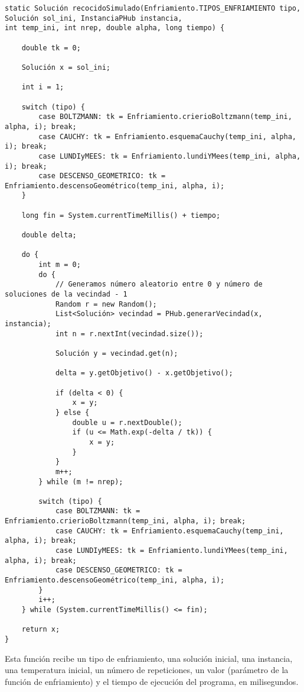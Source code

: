 \documentclass[12pt,a4paper,twoside,openright,titlepage,final]{article}
\begin{document}
\begin{verbatim}
static Solución recocidoSimulado(Enfriamiento.TIPOS_ENFRIAMIENTO tipo, Solución sol_ini, InstanciaPHub instancia,
int temp_ini, int nrep, double alpha, long tiempo) {

    double tk = 0;

    Solución x = sol_ini;

    int i = 1;

    switch (tipo) {
    	case BOLTZMANN: tk = Enfriamiento.crierioBoltzmann(temp_ini, alpha, i); break;
    	case CAUCHY: tk = Enfriamiento.esquemaCauchy(temp_ini, alpha, i); break;
    	case LUNDIyMEES: tk = Enfriamiento.lundiYMees(temp_ini, alpha, i); break;
    	case DESCENSO_GEOMETRICO: tk = Enfriamiento.descensoGeométrico(temp_ini, alpha, i);
    }

    long fin = System.currentTimeMillis() + tiempo;

    double delta;

    do {
        int m = 0;
        do {
            // Generamos número aleatorio entre 0 y número de soluciones de la vecindad - 1
            Random r = new Random();
            List<Solución> vecindad = PHub.generarVecindad(x, instancia);
            int n = r.nextInt(vecindad.size());

            Solución y = vecindad.get(n);

            delta = y.getObjetivo() - x.getObjetivo();

            if (delta < 0) {
                x = y;
            } else {
                double u = r.nextDouble();
                if (u <= Math.exp(-delta / tk)) {
                    x = y;
                }
            }
            m++;
        } while (m != nrep);
        
        switch (tipo) {
            case BOLTZMANN: tk = Enfriamiento.crierioBoltzmann(temp_ini, alpha, i); break;
         	case CAUCHY: tk = Enfriamiento.esquemaCauchy(temp_ini, alpha, i); break;
    	    case LUNDIyMEES: tk = Enfriamiento.lundiYMees(temp_ini, alpha, i); break;
    	    case DESCENSO_GEOMETRICO: tk = Enfriamiento.descensoGeométrico(temp_ini, alpha, i);
        }
        i++;
    } while (System.currentTimeMillis() <= fin);

    return x;
}
\end{verbatim}

Esta función recibe un tipo de enfriamiento, una solución inicial, una instancia, una temperatura inicial, un número de repeticiones, un valor (parámetro de la función de enfriamiento) y el tiempo de ejecución del programa, en milisegundos.\\
\end{document}
